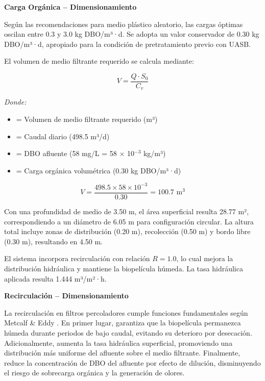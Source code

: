 \documentclass[12pt,a4paper]{article}
\begin{document}
\textbf{Carga Orgánica -- Dimensionamiento}

Según las recomendaciones para medio plástico aleatorio, las cargas óptimas oscilan entre 0.3 y 3.0 kg DBO/m³·d. Se adopta un valor conservador de 0.30 kg DBO/m³·d, apropiado para la condición de pretratamiento previo con UASB.

El volumen de medio filtrante requerido se calcula mediante:

\begin{equation}
V = \frac{Q \cdot S_0}{C_v}
\end{equation}

\textit{Donde:}
\begin{itemize}[noitemsep,leftmargin=2em]
    \item[$V$] = Volumen de medio filtrante requerido (m³)
    \item[$Q$] = Caudal diario (498.5 m³/d)
    \item[$S_0$] = DBO afluente (58 mg/L = 58 $\times$ 10$^{-3}$ kg/m³)
    \item[$C_v$] = Carga orgánica volumétrica (0.30 kg DBO/m³·d)
\end{itemize}

\begin{equation}
V = \frac{498.5 \times 58 \times 10^{-3}}{0.30} = 100.7 \text{ m}^3
\end{equation}

Con una profundidad de medio de 3.50 m, el área superficial resulta 28.77 m², correspondiendo a un diámetro de 6.05 m para configuración circular. La altura total incluye zonas de distribución (0.20 m), recolección (0.50 m) y bordo libre (0.30 m), resultando en 4.50 m.

El sistema incorpora recirculación con relación $R = 1.0$, lo cual mejora la distribución hidráulica y mantiene la biopelícula húmeda. La tasa hidráulica aplicada resulta 1.444 m³/m²·h.

\textbf{Recirculación -- Dimensionamiento}

La recirculación en filtros percoladores cumple funciones fundamentales según Metcalf \& Eddy \cite{metcalf2014}. En primer lugar, garantiza que la biopelícula permanezca húmeda durante periodos de bajo caudal, evitando su deterioro por desecación. Adicionalmente, aumenta la tasa hidráulica superficial, promoviendo una distribución más uniforme del afluente sobre el medio filtrante. Finalmente, reduce la concentración de DBO del afluente por efecto de dilución, disminuyendo el riesgo de sobrecarga orgánica y la generación de olores.
\end{document}
